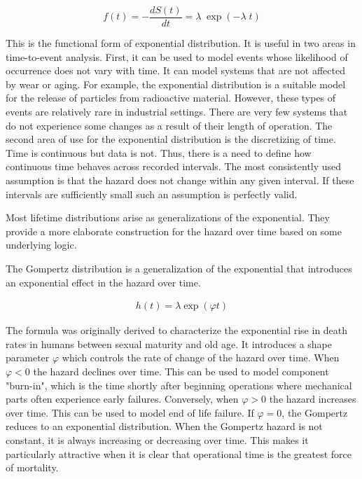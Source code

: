 $$ f(t) = - \frac{d S(t)}{dt} = \lambda\; \exp(- \lambda\; t) $$

This is the functional form of exponential distribution. It is useful in two areas in time-to-event analysis. First, it can be used to model events whose likelihood of occurrence does not vary with time. It can model systems that are not affected by wear or aging. For example, the exponential distribution is a suitable model for the release of particles from radioactive material\cite{Jowett1958}. However, these types of events are relatively rare in industrial settings. There are very few systems that do not experience some changes as a result of their length of operation. The second area of use for the exponential distribution is the discretizing of time. Time is continuous but data is not. Thus, there is a need to define how continuous time behaves across recorded intervals. The most consistently used assumption is that the hazard does not change within any given interval. If these intervals are sufficiently small such an assumption is perfectly valid.

Most lifetime distributions arise as generalizations of the exponential. They provide a more elaborate construction for the hazard over time based on some underlying logic.

The Gompertz distribution is a generalization of the exponential that introduces an exponential effect in the hazard over time.

\begin{align*}
h(t) = \lambda \exp(\varphi t) \tag{ $\lambda > 0, \varphi \in (-\infty, \infty) $}
\end{align*}

The formula was originally derived to characterize the exponential rise in death rates in humans between sexual maturity and old age\cite{Wienke2010}. It introduces a shape parameter $\varphi$ which controls the rate of change of the hazard over time. When $\varphi < 0$ the hazard declines over time. This can be used to model component "burn-in", which is the time shortly after beginning operations where mechanical parts often experience early failures. Conversely, when $\varphi > 0$ the hazard increases over time. This can be used to model end of life failure. If $\varphi = 0$, the Gompertz reduces to an exponential distribution. When the Gompertz hazard is not constant, it is always increasing or decreasing over time. This makes it particularly attractive when it is clear that operational time is the greatest force of mortality.

